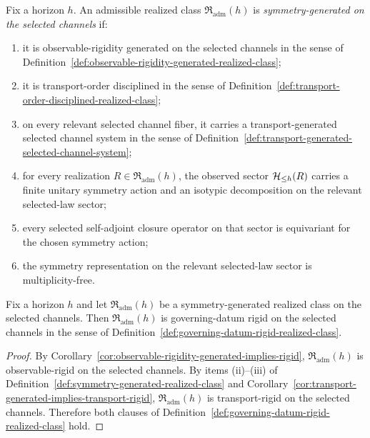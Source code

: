 \begin{definition}
\label{def:symmetry-generated-realized-class}
Fix a horizon $h$. An admissible realized class
$\mathfrak R_{\mathrm{adm}}(h)$ is \emph{symmetry-generated on the selected
channels} if:
\begin{enumerate}[label=(\roman*), leftmargin=2em, itemsep=0.2em]
\item it is observable-rigidity generated on the selected channels in the
      sense of
      Definition~\ref{def:observable-rigidity-generated-realized-class};
\item it is transport-order disciplined in the sense of
      Definition~\ref{def:transport-order-disciplined-realized-class};
\item on every relevant selected channel fiber, it carries a
      transport-generated selected channel system in the sense of
      Definition~\ref{def:transport-generated-selected-channel-system};
\item for every realization $R\in\mathfrak R_{\mathrm{adm}}(h)$, the observed
      sector $\mathcal{H}_{\le h}(R)$ carries a finite unitary symmetry action and an
      isotypic decomposition on the relevant selected-law sector;
\item every selected self-adjoint closure operator on that sector is
      equivariant for the chosen symmetry action;
\item the symmetry representation on the relevant selected-law sector is
      multiplicity-free.
\end{enumerate}
\end{definition}

\begin{corollary}
\label{cor:symmetry-generated-implies-governing-datum-rigid}
Fix a horizon $h$ and let $\mathfrak R_{\mathrm{adm}}(h)$ be a
symmetry-generated realized class on the selected channels. Then
$\mathfrak R_{\mathrm{adm}}(h)$ is governing-datum rigid on the selected
channels in the sense of
Definition~\ref{def:governing-datum-rigid-realized-class}.
\end{corollary}

\begin{proof}
By Corollary~\ref{cor:observable-rigidity-generated-implies-rigid},
$\mathfrak R_{\mathrm{adm}}(h)$ is observable-rigid on the selected channels.
By items (ii)--(iii) of
Definition~\ref{def:symmetry-generated-realized-class} and
Corollary~\ref{cor:transport-generated-implies-transport-rigid},
$\mathfrak R_{\mathrm{adm}}(h)$ is transport-rigid on the selected channels.
Therefore both clauses of
Definition~\ref{def:governing-datum-rigid-realized-class} hold.
\end{proof}

